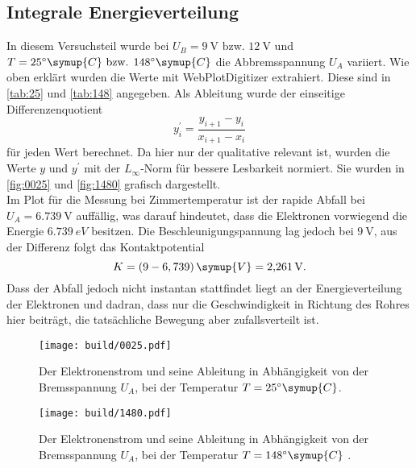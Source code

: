 \subsection{Integrale Energieverteilung}
\label{sec:Integrale Energieverteilung}
In diesem Versuchsteil wurde bei $U_B = \SI{9}{\volt} \text{ bzw. } \SI{12}{\volt}$ und $T
= 25^\circ \symup{C} \text{ bzw. } 148^\circ \symup{C}$ die Abbremsspannung $U_A$
variiert. Wie oben erklärt wurden die Werte mit WebPlotDigitizer extrahiert. Diese sind in
\autoref{tab:25} und \autoref{tab:148} angegeben. Als Ableitung wurde der einseitige
Differenzenquotient
\[
	y^\prime_i = \frac{y_{i+1} - y_i}{x_{i+1} - x_i}
\]
für jeden Wert berechnet. Da hier nur der qualitative relevant ist, wurden die Werte $y$
und $y^\prime$ mit der $L_\infty$-Norm für bessere Lesbarkeit normiert. Sie wurden in
\autoref{fig:0025} und \autoref{fig:1480} grafisch dargestellt. 
\\
Im Plot für die Messung bei Zimmertemperatur ist der rapide Abfall bei $U_A =
\SI{6,739}{\volt}$ auffällig, was darauf hindeutet, dass die Elektronen vorwiegend die
Energie $\SI{6,739}{eV}$ besitzen. Die Beschleunigungspannung lag jedoch bei
$\SI{9}{\volt}$, aus der Differenz folgt das Kontaktpotential
\begin{equation}
	K = (9 - 6,739) \, \symup{V} = \SI{2.261}{\volt}.
\end{equation}
Dass der Abfall jedoch nicht instantan stattfindet liegt an der Energieverteilung der
Elektronen und dadran, dass nur die Geschwindigkeit in Richtung des Rohres hier beiträgt,
die tatsächliche Bewegung aber zufallsverteilt ist.
\begin{figure}[H]
	\texttt{[image: build/0025.pdf]}
	\caption{Der Elektronenstrom und seine Ableitung in Abhängigkeit von der
	Bremsspannung $U_A$, bei der Temperatur $T=25^\circ \symup{C}$.}
	\label{fig:0025}
\end{figure}
\begin{figure}[H]
	\texttt{[image: build/1480.pdf]}
	\caption{Der Elektronenstrom und seine Ableitung in Abhängigkeit von der
	Bremsspannung $U_A$, bei der Temperatur $T=148^\circ \symup{C}$ .}
	\label{fig:1480}
\end{figure}

